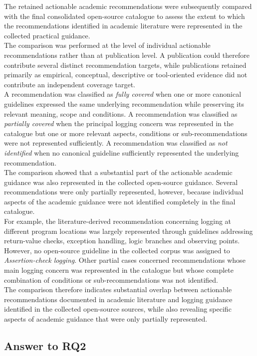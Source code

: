 The retained actionable academic recommendations were subsequently compared with
the final consolidated open-source catalogue to assess the extent to which the
recommendations identified in academic literature were represented in the collected
practical guidance.
\\
The comparison was performed at the level of individual actionable recommendations
rather than at publication level. A publication could therefore contribute several
distinct recommendation targets, while publications retained primarily as
empirical, conceptual, descriptive or tool-oriented evidence did not contribute an
independent coverage target.
\\
A recommendation was classified as \textit{fully covered} when one or more
canonical guidelines expressed the same underlying recommendation while preserving
its relevant meaning, scope and conditions. A recommendation was classified as
\textit{partially covered} when the principal logging concern was represented in
the catalogue but one or more relevant aspects, conditions or sub-recommendations
were not represented sufficiently. A recommendation was classified as
\textit{not identified} when no canonical guideline sufficiently represented the
underlying recommendation.
\\
The comparison showed that a substantial part of the actionable academic guidance
was also represented in the collected open-source guidance. Several
recommendations were only partially represented, however, because individual
aspects of the academic guidance were not identified completely in the final
catalogue.
\\
For example, the literature-derived recommendation concerning logging at different
program locations was largely represented through guidelines addressing
return-value checks, exception handling, logic branches and observing points.
However, no open-source guideline in the collected corpus was assigned to
\textit{Assertion-check logging}. Other partial cases concerned recommendations
whose main logging concern was represented in the catalogue but whose complete
combination of conditions or sub-recommendations was not identified.
\\
The comparison therefore indicates substantial overlap between actionable
recommendations documented in academic literature and logging guidance identified
in the collected open-source sources, while also revealing specific aspects of
academic guidance that were only partially represented.


\subsection{Answer to RQ2}

